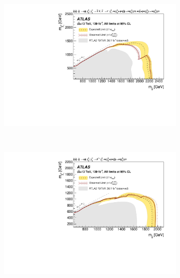 \begin{figure}[tp]
\centering
\begin{subfigure}{0.62\textwidth}
\centering
\includegraphics[width=\textwidth]{figures/2ljets_strong_contours_gluino_slepton.pdf}
\end{subfigure}
\\
\begin{subfigure}{0.62\textwidth}
\centering
\includegraphics[width=\textwidth]{figures/2ljets_strong_contours_gluino_z.pdf}
\end{subfigure}
\\
\begin{subfigure}{0.62\textwidth}
\centering

\end{subfigure}
\end{figure}
